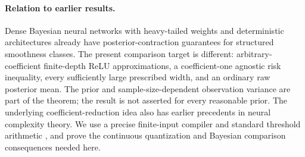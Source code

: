 \documentclass[11pt]{article}
\begin{document}
\paragraph{Relation to earlier results.}
Dense Bayesian neural networks with heavy-tailed weights and deterministic
architectures already have posterior-contraction guarantees for structured
smoothness classes\cite{castillo-egels}.  The present comparison target is
different: arbitrary-coefficient finite-depth ReLU approximations, a
coefficient-one agnostic risk inequality, every sufficiently large
prescribed width, and an ordinary raw posterior mean.  The prior and
sample-size-dependent observation variance are part of the theorem; the
result is not asserted for every reasonable prior.  The underlying
coefficient-reduction idea also has earlier precedents in neural
complexity theory\cite{maass,vardi-shamir}.  We use a precise finite-input
compiler\cite{booleancompiler} and standard threshold arithmetic
\cite{hab}, and prove the continuous quantization and Bayesian comparison
consequences needed here.
















\end{document}
